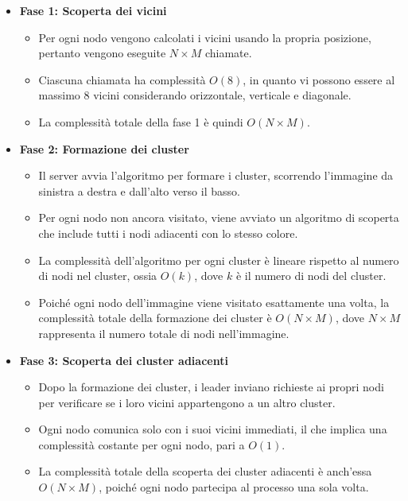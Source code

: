 \documentclass[12pt, a4paper]{report}
\begin{document}
\begin{itemize}
    \item \textbf{Fase 1: Scoperta dei vicini}
    \begin{itemize}
      \item Per ogni nodo vengono calcolati i vicini usando la propria posizione, pertanto vengono eseguite $N \times M$ chiamate.
      \item Ciascuna chiamata ha complessit\`a $O(8)$, in quanto vi possono essere al massimo 8 vicini considerando orizzontale, verticale e diagonale.
      \item La complessit\`a totale della fase 1 \`e quindi $O(N \times M)$.
    \end{itemize}

    \item \textbf{Fase 2: Formazione dei cluster}
    \begin{itemize}
        \item Il server avvia l'algoritmo per formare i cluster, scorrendo l'immagine da sinistra a destra e dall'alto verso il basso.
        \item Per ogni nodo non ancora visitato, viene avviato un algoritmo di scoperta che include tutti i nodi adiacenti con lo stesso colore.
        \item La complessit\`a dell'algoritmo per ogni cluster \`e lineare rispetto al numero di nodi nel cluster, ossia $O(k)$, dove $k$ \`e il numero di nodi del cluster.
        \item Poiché ogni nodo dell'immagine viene visitato esattamente una volta, la complessit\`a totale della formazione dei cluster \`e $O(N \times M)$, dove $N \times M$ rappresenta il numero totale di nodi nell'immagine.
    \end{itemize}

    \item \textbf{Fase 3: Scoperta dei cluster adiacenti}
    \begin{itemize}
        \item Dopo la formazione dei cluster, i leader inviano richieste ai propri nodi per verificare se i loro vicini appartengono a un altro cluster.
        \item Ogni nodo comunica solo con i suoi vicini immediati, il che implica una complessit\`a costante per ogni nodo, pari a $O(1)$.
        \item La complessit\`a totale della scoperta dei cluster adiacenti \`e anch'essa $O(N \times M)$, poiché ogni nodo partecipa al processo una sola volta.
    \end{itemize}


\end{itemize}
\end{document}
